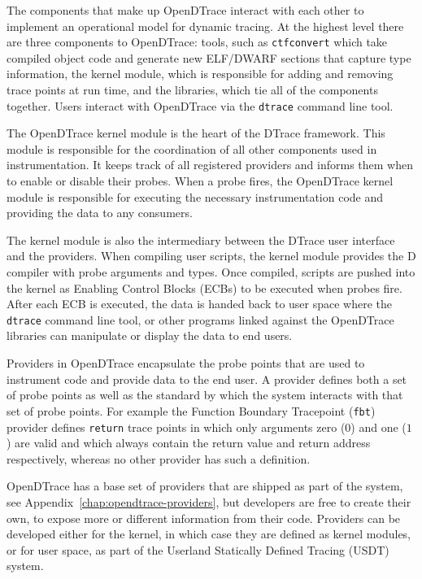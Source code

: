 The components that make up OpenDTrace interact with each other to
implement an operational model for dynamic tracing.  At the highest
level there are three components to OpenDTrace: tools, such as
\texttt{ctfconvert} which take compiled object code and generate new
ELF/DWARF sections that capture type information, the kernel module,
which is responsible for adding and removing trace points at run time,
and the libraries, which tie all of the components together.  Users
interact with OpenDTrace via the \texttt{dtrace} command line tool.

The OpenDTrace kernel module is the heart of the DTrace
framework. This module is responsible for the coordination of all
other components used in instrumentation. It keeps track of all
registered providers and informs them when to enable or disable their
probes. When a probe fires, the OpenDTrace kernel module is
responsible for executing the necessary instrumentation code and
providing the data to any consumers.

The kernel module is also the intermediary between the DTrace user
interface and the providers. When compiling user scripts, the kernel
module provides the D compiler with probe arguments and types. Once
compiled, scripts are pushed into the kernel as Enabling Control Blocks
(ECBs) to be executed when probes fire. After each ECB is executed,
the data is handed back to user space where the \texttt{dtrace}
command line tool, or other programs linked against the OpenDTrace
libraries can manipulate or display the data to end users.

Providers in OpenDTrace encapsulate the probe points that are used to
instrument code and provide data to the end user. A provider defines
both a set of probe points as well as the standard by which the system
interacts with that set of probe points.  For example the Function
Boundary Tracepoint (\texttt{fbt}) provider defines \texttt{return} trace
points in which only arguments zero ($0$) and one ($1$) are valid and
which always contain the return value and return address
respectively, whereas no other provider has such a definition.

OpenDTrace has a base set of providers that are shipped as part of the
system, see Appendix~\ref{chap:opendtrace-providers}, but developers are free to
create their own, to expose more or different information from their
code. Providers can be developed either for the kernel, in which case
they are defined as kernel modules, or for user space, as part of the
Userland Statically Defined Tracing (USDT) system.

